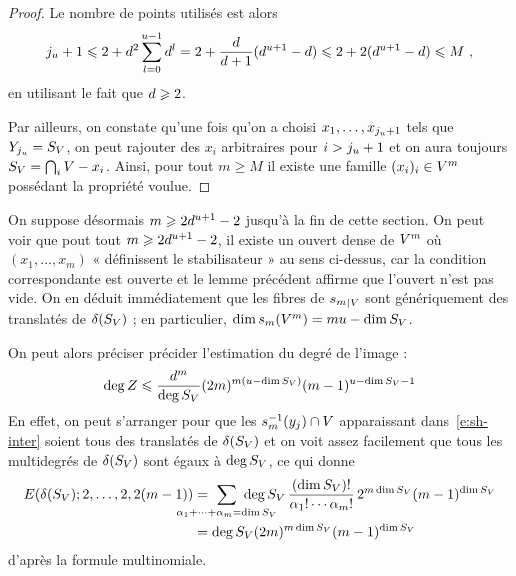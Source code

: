 \begin{proof}
  Le nombre de points utilisés est alors
  \begin{equation}
    j_u + 1
    \leqslant
    2 + d^2 \sum_{l=0}^{u-1} d^l
    =
    2 + \frac{d}{d+1} (d^{u+1} - d)
    \leqslant
    2 + 2 (d^{u+1} - d)
    \leqslant M
    \text{ ,}
  \end{equation}
  en utilisant le fait que \( d \geqslant 2 \).

  Par ailleurs, on constate qu'une fois qu'on a choisi \( x_1, \dots,
    x_{j_u+1} \) tels que \( Y_{j_u} = S_V \), on peut rajouter
  des \( x_i \) arbitraires pour \( i > j_u + 1 \) et on aura toujours \(
    S_V = \bigcap_i V - x_i \). Ainsi, pour tout \( m \ge M \) il
  existe une famille \( (x_i)_i \in V^m \) possédant la propriété voulue.
\end{proof}

On suppose désormais \( m \geqslant 2 d^{u+1} - 2 \) jusqu'à la fin de cette
section.  On peut voir que pout tout \( m \geqslant 2 d^{u+1} - 2
\), il existe un ouvert dense de \( V^m \) où \( (x_1, \dots, x_m) \) «
définissent le stabilisateur » au sens ci-dessus, car la condition
correspondante est ouverte et le lemme précédent affirme que l'ouvert n'est
pas vide. On en déduit immédiatement que les fibres de \( {s_m}_{|V} \)
sont génériquement des translatés de \( \delta(S_V) \) ; en particulier,
\( \dim s_m(V^m) = m u - \dim S_V \).

On peut alors préciser précider l'estimation du degré de l'image :
\begin{equation}
  \deg Z
  \leqslant
  \frac{ d^m }{ \deg S_V }
  (2m)^{m(u-\dim S_V)} (m-1)^{u - \dim S_V - 1}
\end{equation}
En effet, on peut s'arranger pour que les \( s_m^{-1}(y_j) \cap V \)
apparaissant dans~\eqref{e:sh-inter} soient tous des translatés de \(
  \delta(S_V) \) et on voit assez facilement que tous les multidegrés de
\( \delta(S_V) \) sont égaux à \( \deg S_V \), ce qui donne
\begin{align}
  E( \delta(S_\avar); 2, \dots, 2, 2(m-1) )
  & =
  \ \sum_{ \mathclap{\alpha_1 + \dots + \alpha_m = \dim S_\avar} } \
  \deg S_\avar
  \, \frac{ (\dim S_\avar)! }{ \alpha_1! \cdots \alpha_m! }
  \, 2^{m\dim S_\avar} (m-1)^{\dim S_\avar}
  \\ & =
  \deg S_\avar
  (2m)^{m\dim S_\avar} (m-1)^{\dim S_\avar}
\end{align}
d'après la formule multinomiale.


